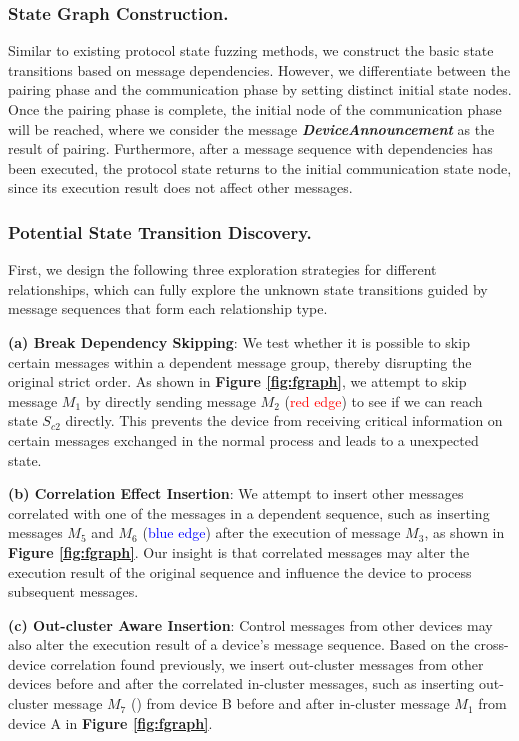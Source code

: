 \documentclass[10pt,journal,compsoc]{IEEEtran}
\begin{document}
\subsubsection{State Graph Construction.} Similar to existing protocol state fuzzing methods, we construct the basic state transitions based on message dependencies. However, we differentiate between the pairing phase and the communication phase by setting distinct initial state nodes. Once the pairing phase is complete, the initial node of the communication phase will be reached, where we consider the message \textit{\textbf{DeviceAnnouncement}} as the result of pairing. Furthermore, after a message sequence with dependencies has been executed, the protocol state returns to the initial communication state node, since its execution result does not affect other messages.

\subsubsection{Potential State Transition Discovery.} First, we design the following three exploration strategies for different relationships, which can fully explore the unknown state transitions guided by message sequences that form each relationship type.

\textbf{(a) Break Dependency Skipping}: We test whether it is possible to skip certain messages within a dependent message group, thereby disrupting the original strict order. As shown in \textbf{Figure \ref{fig:fgraph}}, we attempt to skip message $M_1$ by directly sending message $M_2$ (\textcolor{red}{red edge}) to see if we can reach state $S_{c2}$ directly. This prevents the device from receiving critical information on certain messages exchanged in the normal process and leads to a unexpected state.

\textbf{(b) Correlation Effect Insertion}: We attempt to insert other messages correlated with one of the messages in a dependent sequence, such as inserting messages $M_5$ and $M_6$ (\textcolor{blue}{blue edge}) after the execution of message $M_3$, as shown in \textbf{Figure \ref{fig:fgraph}}. Our insight is that correlated messages may alter the execution result of the original sequence and influence the device to process subsequent messages.

\textbf{(c) Out-cluster Aware Insertion}: Control messages from other devices may also alter the execution result of a device's message sequence. Based on the cross-device correlation found previously, we insert out-cluster messages from other devices before and after the correlated in-cluster messages, such as inserting out-cluster message $M_7$ ({\color{ForestGreen}{green edge}}) from device B before and after in-cluster message $M_1$ from device A in \textbf{Figure \ref{fig:fgraph}}.
\end{document}
